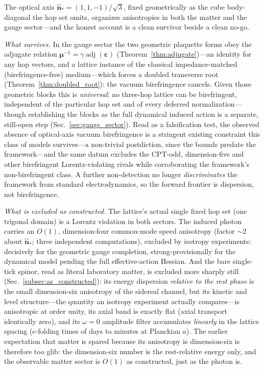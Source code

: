 
The optical axis $\hat{\mathbf{n}}_* = (1,1,-1)/\sqrt3$, fixed geometrically as the
cube body-diagonal the hop set omits, organizes anisotropies in both the matter and the
gauge sector---and the honest account is a clean survivor beside a clean no-go.

\emph{What survives.} In the gauge sector the two geometric plaquette forms obey the
adjugate relation $\boldsymbol{\mu}^{-1} = \gamma\operatorname{adj}
(\boldsymbol{\varepsilon})$ (Theorem~\ref{thm:adjugate})---an identity for any hop
vectors, and a lattice instance of the classical impedance-matched (birefringence-free)
medium---which forces a doubled transverse root (Theorem~\ref{thm:doubled_root}): the
vacuum birefringence cancels. Given those geometric blocks this is \emph{universal}:
no three-hop lattice can be birefringent, independent of the particular hop set and of
every deferred normalization---though establishing the blocks as the full dynamical
induced action is a separate, still-open step (Sec.~\ref{sec:gauge_sector}). Read as a falsification test, the observed absence
of optical-axis vacuum birefringence is a stringent existing constraint this class of
models survives---a non-trivial postdiction, since the bounds predate the framework---and
the same datum excludes the CPT-odd, dimension-five and other birefringent
Lorentz-violating rivals while corroborating the framework's non-birefringent class. A
further non-detection no longer \emph{discriminates} the framework from standard
electrodynamics, so the forward frontier is dispersion, not birefringence.

\emph{What is excluded as constructed.} The lattice's actual single fixed hop set (one
trigonal domain) is a Lorentz violation in both sectors. The induced photon carries an
$O(1)$, dimension-four common-mode speed anisotropy (factor $\sim2$ about
$\hat{\mathbf{n}}_*$; three independent computations), excluded by isotropy experiments:
decisively for the geometric gauge completion, strong-provisionally for the dynamical
model pending the full effective-action Hessian. And the bare single-tick spinor, read
as literal laboratory matter, is excluded more sharply still
(Sec.~\ref{subsec:as_constructed}): its energy dispersion \emph{relative to the rest
phase} is the small dimension-six anisotropy of the sidereal channel, but its kinetic and
level structure---the quantity an isotropy experiment actually compares---is anisotropic
at order unity, its axial band is exactly flat (axial transport identically zero), and its
$\omega=0$ amplitude filter accumulates \emph{linearly} in the lattice spacing
($e$-folding times of days to minutes at Planckian $a$). The earlier expectation that
matter is spared because its anisotropy is dimension-six is therefore too glib: the
dimension-six number is the rest-relative energy only, and the observable matter sector is
$O(1)$ as constructed, just as the photon is.

